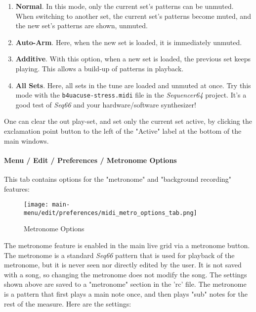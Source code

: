    \begin{enumerate}
      \item \textbf{Normal}.
         In this mode, only the current set's patterns can be unmuted.
         When switching to another set, the current set's patterns become
         muted, and the new set's patterns are shown, unmuted.
      \item \textbf{Auto-Arm}.
         Here, when the new set is loaded, it is immediately unmuted.
      \item \textbf{Additive}.
         With this option, when a new set is loaded, the previous set keeps
         playing. This allows a build-up of patterns in playback.
      \item \textbf{All Sets}.
         Here, all sets in the tune are loaded and unmuted at once.
         Try this mode with the \texttt{b4uacuse-stress.midi} file
         in the \textsl{Sequencer64} project.  It's a good test of
         \textsl{Seq66} and your hardware/software synthesizer!
   \end{enumerate}

   One can clear the out play-set, and set only the current set active, by
   clicking the exclamation point button to the left of the "Active" label at
   the bottom of the main windows.

\paragraph{Menu / Edit / Preferences / Metronome Options}
\label{paragraph:menu_edit_preferences_metronom_options}

   This tab contains options for the "metronome" and
   "background recording" features:

\begin{figure}[H]
   \centering 
   \texttt{[image: main-menu/edit/preferences/midi\_metro\_options\_tab.png]}
   \caption{Metronome Options}
   \label{fig:midi_metro_options_tab}
\end{figure}

   \setcounter{ItemCounter}{0}      %

   The metronome feature is enabled in the main live grid via a metronome
   button.
   The metronome is a standard \textsl{Seq66} pattern that is used
   for playback of the metronome, but it is never seen
   nor directly edited by the user.
   It is not saved with a song, so changing the metronome does not modify the
   song.
   The settings shown above are saved to a "metronome" section in the 'rc'
   file.
   The metronome is a pattern that first plays a main note once, and then
   plays "sub" notes for the rest of the measure.
   Here are the settings:


